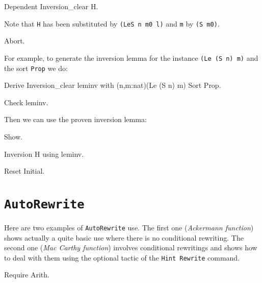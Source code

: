\begin{coq_example*}
\begin{coq_example}
Dependent Inversion_clear H.
\end{coq_example}

Note that \texttt{H} has been substituted by \texttt{(LeS n m0 l)} and
\texttt{m} by \texttt{(S m0)}.


\begin{coq_eval}
Abort.
\end{coq_eval}

For example, to generate the inversion lemma for the instance
\texttt{(Le (S n) m)} and the sort \texttt{Prop} we do:

\begin{coq_example*}
Derive Inversion_clear leminv with (n,m:nat)(Le (S n) m) Sort Prop.
\end{coq_example*}

\begin{coq_example}
Check leminv.
\end{coq_example}

Then we can use the proven inversion lemma:

\begin{coq_example}
Show.
\end{coq_example}

\begin{coq_example}
Inversion H using leminv.
\end{coq_example}

\begin{coq_eval}
Reset Initial.
\end{coq_eval}

\section{\tt AutoRewrite}
\label{AutoRewrite-example}

Here are two examples of {\tt AutoRewrite} use. The first one ({\em Ackermann
function}) shows actually a quite basic use where there is no conditional
rewriting. The second one ({\em Mac Carthy function}) involves conditional
rewritings and shows how to deal with them using the optional tactic of the
{\tt Hint~Rewrite} command.

\firstexample
{}

\begin{coq_example*}
Require Arith.


\end{coq_example*}
\end{coq_example*}
